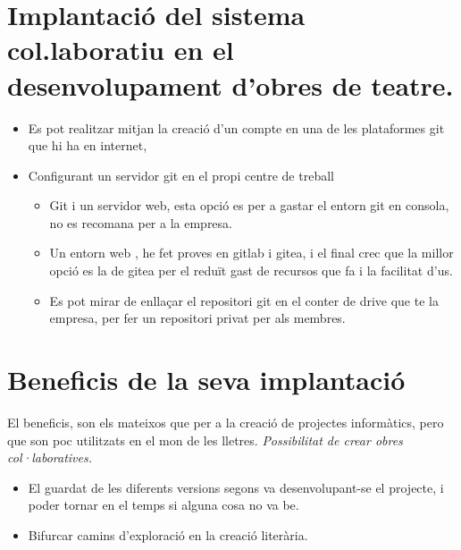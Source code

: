 \documentclass[
  10pt,
]{krantz}
\providecommand{\tightlist}{%
  \setlength{\itemsep}{0pt}\setlength{\parskip}{0pt}}
\begin{document}
\hypertarget{implantaciuxf3-del-sistema-col.laboratiu-en-el-desenvolupament-dobres-de-teatre.}{%
\section{Implantació del sistema col.laboratiu en el desenvolupament d'obres de teatre.}\label{implantaciuxf3-del-sistema-col.laboratiu-en-el-desenvolupament-dobres-de-teatre.}}

\begin{itemize}
\tightlist
\item
  Es pot realitzar mitjan la creació d'un compte en una de les plataformes git que hi ha en internet,
\item
  Configurant un servidor git en el propi centre de treball

  \begin{itemize}
  \tightlist
  \item
    Git i un servidor web, esta opció es per a gastar el entorn git en consola, no es recomana per a la empresa.
  \item
    Un entorn web , he fet proves en gitlab i gitea, i el final crec que la millor opció es la de gitea per el reduït gast de recursos que fa i la facilitat d'us.
  \item
    Es pot mirar de enllaçar el repositori git en el conter de drive que te la empresa, per fer un repositori privat per als membres.
  \end{itemize}
\end{itemize}

\hypertarget{beneficis-de-la-seva-implantaciuxf3}{%
\section{Beneficis de la seva implantació}\label{beneficis-de-la-seva-implantaciuxf3}}

El beneficis, son els mateixos que per a la creació de projectes informàtics, pero que son poc utilitzats en el mon de les lletres. \emph{Possibilitat de crear obres col·laboratives.}

\begin{itemize}
\tightlist
\item
  El guardat de les diferents versions segons va desenvolupant-se el projecte, i poder tornar en el temps si alguna cosa no va be.
\item
  Bifurcar camins d'exploració en la creació literària.
\end{itemize}
\end{document}
